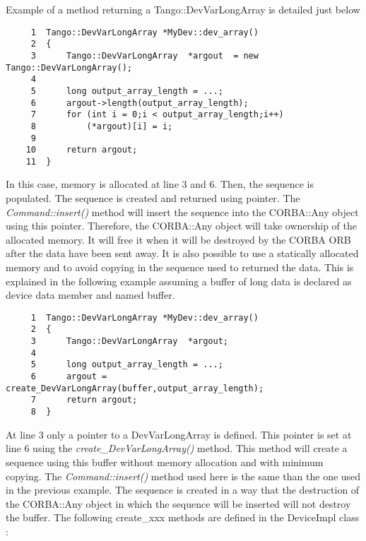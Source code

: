 Example of a method returning a Tango::DevVarLongArray
is detailed just below


\begin{verbatim}
     1  Tango::DevVarLongArray *MyDev::dev_array()
     2  {
     3      Tango::DevVarLongArray  *argout  = new Tango::DevVarLongArray();
     4                  
     5      long output_array_length = ...;
     6      argout->length(output_array_length);
     7      for (int i = 0;i < output_array_length;i++)
     8          (*argout)[i] = i;
     9  
    10      return argout;
    11  }
\end{verbatim}


In this case, memory is allocated at line 3 and 6. Then, the sequence
is populated. The sequence is created and returned using pointer.
The \emph{Command::insert()} method will insert the sequence into
the CORBA::Any object using this pointer. Therefore, the CORBA::Any
object will take ownership of the allocated memory. It will free it
when it will be destroyed by the CORBA ORB after the data have been
sent away. It is also possible to use a statically allocated memory
and to avoid copying in the sequence used to returned the data. This
is explained in the following example assuming a buffer of long data
is declared as device data member and named buffer.


\begin{verbatim}
     1  Tango::DevVarLongArray *MyDev::dev_array()
     2  {
     3      Tango::DevVarLongArray  *argout;
     4                  
     5      long output_array_length = ...;
     6      argout = create_DevVarLongArray(buffer,output_array_length);
     7      return argout;
     8  }
\end{verbatim}


At line 3 only a pointer to a DevVarLongArray is defined. This pointer
is set at line 6 using the \emph{create\_DevVarLongArray()}
method. This method will create a sequence using this buffer without
memory allocation and with minimum copying. The \emph{Command::insert()}
method used here is the same than the one used in the previous example.
The sequence is created in a way that the destruction of the CORBA::Any
object in which the sequence will be inserted will not destroy the
buffer. The following create\_xxx methods are defined in the DeviceImpl
class :

\vspace{0.3cm}


